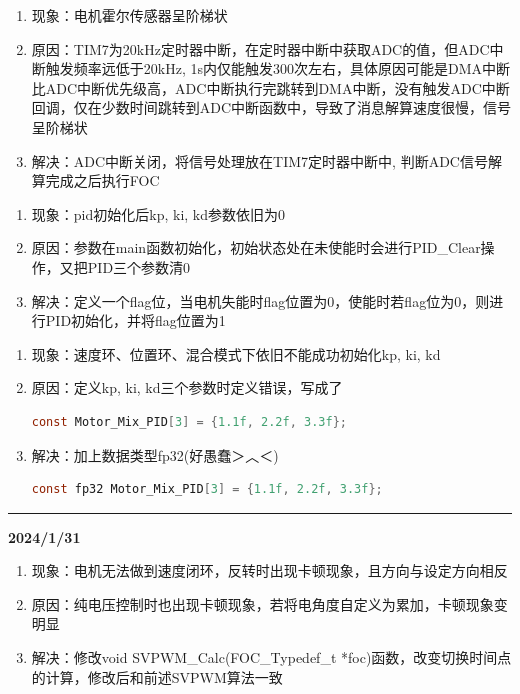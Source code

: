 \documentclass[main.tex]{subfiles}
\begin{document}
\begin{enumerate}
    \item 现象：电机霍尔传感器呈阶梯状
    \item 原因：TIM7为20kHz定时器中断，在定时器中断中获取ADC的值，但ADC中断触发频率远低于20kHz, 1s内仅能触发300次左右，具体原因可能是DMA中断比ADC中断优先级高，ADC中断执行完跳转到DMA中断，没有触发ADC中断回调，仅在少数时间跳转到ADC中断函数中，导致了消息解算速度很慢，信号呈阶梯状
    \item 解决：ADC中断关闭，将信号处理放在TIM7定时器中断中, 判断ADC信号解算完成之后执行FOC \\
\end{enumerate}

\begin{enumerate}
    \item 现象：pid初始化后kp, ki, kd参数依旧为0
    \item 原因：参数在main函数初始化，初始状态处在未使能时会进行PID\_Clear操作，又把PID三个参数清0
    \item 解决：定义一个flag位，当电机失能时flag位置为0，使能时若flag位为0，则进行PID初始化，并将flag位置为1 \\
\end{enumerate}

\begin{enumerate}
    \item 现象：速度环、位置环、混合模式下依旧不能成功初始化kp, ki, kd
    \item 原因：定义kp, ki, kd三个参数时定义错误，写成了
    \begin{lstlisting}[language=C]
        const Motor_Mix_PID[3] = {1.1f, 2.2f, 3.3f};
    \end{lstlisting}
    \item 解决：加上数据类型fp32(好愚蠢＞︿＜)
    \begin{lstlisting}[language=C]
        const fp32 Motor_Mix_PID[3] = {1.1f, 2.2f, 3.3f};
    \end{lstlisting}
\end{enumerate}
\rule{\linewidth}{0.3pt}
\textbf{2024/1/31}

\begin{enumerate}
    \item 现象：电机无法做到速度闭环，反转时出现卡顿现象，且方向与设定方向相反
    \item 原因：纯电压控制时也出现卡顿现象，若将电角度自定义为累加，卡顿现象变明显
    \item 解决：修改void SVPWM\_Calc(FOC\_Typedef\_t *foc)函数，改变切换时间点的计算，修改后和前述SVPWM算法一致\\
\end{enumerate}
\end{document}
